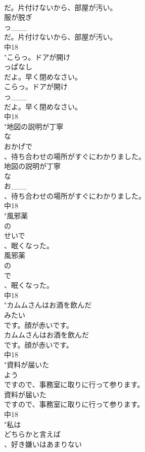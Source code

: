 \documentclass[8pt]{extreport}
\begin{document}
\begin{CJK}{UTF8}{min}
\\	だ。片付けないから、部屋が汚い。
\\	服が脱ぎ
\\	っ___
\\	だ。片付けないから、部屋が汚い。
\\	中18
\\	"こらっ。ドアが開け
\\	っぱなし
\\	だよ。早く閉めなさい。
\\	こらっ。ドアが開け
\\	っ___
\\	だよ。早く閉めなさい。
\\	中18
\\	"地図の説明が丁寧
\\	な
\\	おかげで
\\	、待ち合わせの場所がすぐにわかりました。
\\	地図の説明が丁寧
\\	な
\\	お___
\\	、待ち合わせの場所がすぐにわかりました。
\\	中18
\\	"風邪薬
\\	の
\\	せいで
\\	、眠くなった。
\\	風邪薬
\\	の
\\	で
\\	、眠くなった。
\\	中18
\\	"カムムさんはお酒を飲んだ
\\	みたい
\\	です。顔が赤いです。
\\	カムムさんはお酒を飲んだ
\\	です。顔が赤いです。
\\	中18
\\	"資料が届いた
\\	よう
\\	ですので、事務室に取りに行って参ります。
\\	資料が届いた
\\	ですので、事務室に取りに行って参ります。
\\	中18
\\	"私は
\\	どちらかと言えば
\\	、好き嫌いはあまりない

\end{CJK}
\end{document}
